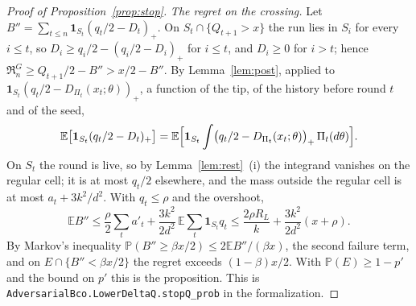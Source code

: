 \documentclass[11pt]{amsart}
\theoremstyle{definition}
\numberwithin{equation}{section}
\newcommand{\E}{\mathbb{E}}
\newcommand{\Prob}{\mathbb{P}}
\newcommand{\Reg}{\mathfrak{R}}
\begin{document}
\begin{proof}[Proof of Proposition~\ref{prop:stop}]
\emph{The regret on the crossing.} Let $B''=\sum_{t\le n}\mathbf 1_{S_t}(q_t/2-D_t)_+$. On $S_t\cap\{Q_{t+1}>x\}$ the run lies in $S_i$ for every $i\le t$, so $D_i\ge q_i/2-(q_i/2-D_i)_+$ for $i\le t$, and $D_i\ge0$ for $i>t$; hence $\Reg^G_n\ge Q_{t+1}/2-B''>x/2-B''$. By Lemma~\ref{lem:post}, applied to $\mathbf 1_{S_t}(q_t/2-D_{\Pi_t}(x_t;\theta))_+$, a function of the tip, of the history before round $t$ and of the seed,
\[
\E\bigl[\mathbf 1_{S_t}(q_t/2-D_t)_+\bigr]=\E\Bigl[\mathbf 1_{S_t}\int\bigl(q_t/2-D_{\Pi_t}(x_t;\theta)\bigr)_+\,\Pi_t(d\theta)\Bigr].
\]
On $S_t$ the round is live, so by Lemma~\ref{lem:rest}~(i) the integrand vanishes on the regular cell; it is at most $q_t/2$ elsewhere, and the mass outside the regular cell is at most $a_t+3k^2/d^2$. With $q_t\le\rho$ and the overshoot,
\[
\E B''\le\frac\rho2\sum_ta'_t+\frac{3k^2}{2d^2}\,\E\sum_t\mathbf 1_{S_t}q_t\le\frac{2\rho R_L}k+\frac{3k^2}{2d^2}(x+\rho).
\]
By Markov's inequality $\Prob(B''\ge\beta x/2)\le2\E B''/(\beta x)$, the second failure term, and on $E\cap\{B''<\beta x/2\}$ the regret exceeds $(1-\beta)x/2$. With $\Prob(E)\ge1-p'$ and the bound on $p'$ this is the proposition.
This is \texttt{AdversarialBco.\allowbreak LowerDeltaQ.\allowbreak stopQ\_prob} in the formalization.
\end{proof}
\end{document}
